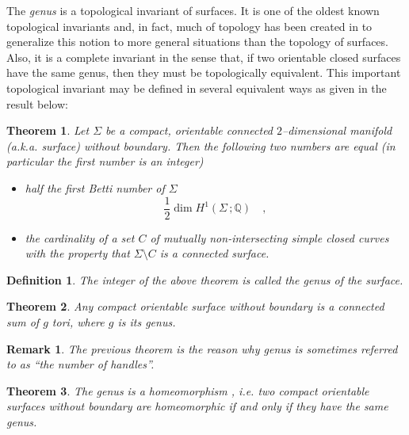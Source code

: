 \documentclass[12pt]{article}
\newtheorem*{thm}{Theorem}
\newtheorem*{rem}{Remark}
\newtheorem*{defn}{Definition}
\begin{document}
The \emph{genus} is a topological invariant of surfaces.  It is one of the oldest known topological invariants and, in fact, much of topology has been created in  to generalize this notion to more general situations than the topology of surfaces.  Also, it is a complete invariant in the sense that, if two orientable closed surfaces have the same genus, then they must be topologically equivalent.  This important topological invariant may be defined in several equivalent ways as given in the result below:

\begin{thm}Let $\Sigma$ be a  compact, orientable connected $2$--dimensional manifold (a.k.a. surface) without boundary. Then the following two numbers are equal (in particular the first number is an integer)
\begin{itemize}
\item[(i)] half the first Betti number of $\Sigma$
$$\frac{1}{2}\dim H^1(\Sigma\,;\mathbb{Q})\quad,$$
\item[(ii)] the cardinality of a  set $C$ of mutually non-intersecting simple
closed curves with the property that $\Sigma\setminus C$ is a connected  surface.
\end{itemize}
\end{thm}

 \begin{defn} The integer of the above theorem is called the genus of the 
surface.
\end{defn}

\begin{thm} Any compact orientable surface without boundary is a connected sum of $g$ tori, where $g$ is its genus.
\end{thm}

\begin{rem} The previous theorem is the reason why genus is sometimes referred to as ``the number of handles''.
\end{rem}

\begin{thm} The genus is a   homeomorphism , i.e. two   
compact orientable surfaces without boundary are homeomorphic if and only if they have the same genus.
\end{thm}
\end{document}
